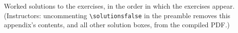 \documentclass[11pt]{article}
\begin{document}
Worked solutions to the exercises, in the order in which the exercises appear. (Instructors: uncommenting \verb|\solutionsfalse| in the preamble removes this appendix's contents, and all other solution boxes, from the compiled PDF.)



































\end{document}

